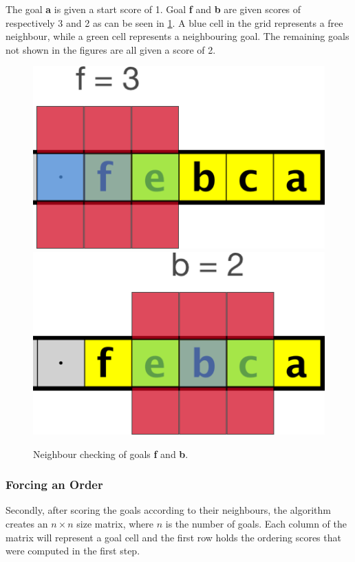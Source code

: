The goal \textbf{a} is given a start score of 1. 
Goal \textbf{f} and \textbf{b} are given scores of respectively 3 and 2 as can be seen in \cref{fig:grid2}. 
A blue cell in the grid represents a free neighbour, while a green cell represents a neighbouring goal.
The remaining goals not shown in the figures are all given a score of 2. 

\begin{figure}[h!]
  \centering
  \includegraphics[width=.5\columnwidth]{graphics/goal_pri_3.png}
  \includegraphics[width=.5\columnwidth]{graphics/goal_pri_2.png}
  \caption{\label{fig:grid2}Neighbour checking of goals \textbf{f} and \textbf{b}.}
\end{figure}

\subsubsection{Forcing an Order }
Secondly, after scoring the goals according to their neighbours, the algorithm creates an $n \times n$ size matrix, where $n$ is the number of goals. 
Each column of the matrix will represent a goal cell and the first row holds the ordering scores that were computed in the first step. 


